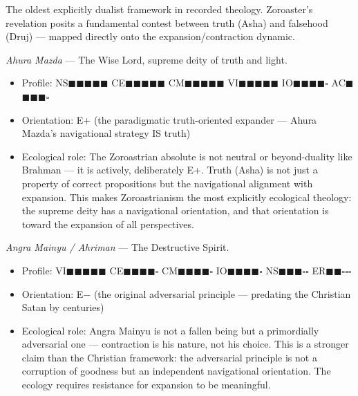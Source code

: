 The oldest explicitly dualist framework in recorded theology. Zoroaster's revelation posits a fundamental contest between truth (Asha) and falsehood (Druj) — mapped directly onto the expansion/contraction dynamic.


\textit{Ahura Mazda} — The Wise Lord, supreme deity of truth and light.

\begin{itemize}[nosep,leftmargin=*]
  \item Profile: NS$\blacksquare$$\blacksquare$$\blacksquare$$\blacksquare$$\blacksquare$ CE$\blacksquare$$\blacksquare$$\blacksquare$$\blacksquare$$\blacksquare$ CM$\blacksquare$$\blacksquare$$\blacksquare$$\blacksquare$$\blacksquare$ VI$\blacksquare$$\blacksquare$$\blacksquare$$\blacksquare$$\blacksquare$ IO$\blacksquare$$\blacksquare$$\blacksquare$$\blacksquare$$\square$ AC$\blacksquare$$\blacksquare$$\blacksquare$$\blacksquare$$\square$
  \item Orientation: E+ (the paradigmatic truth-oriented expander — Ahura Mazda's navigational strategy IS truth)
  \item Ecological role: The Zoroastrian absolute is not neutral or beyond-duality like Brahman — it is actively, deliberately E+. Truth (Asha) is not just a property of correct propositions but the navigational alignment with expansion. This makes Zoroastrianism the most explicitly ecological theology: the supreme deity has a navigational orientation, and that orientation is toward the expansion of all perspectives.
\end{itemize}


\textit{Angra Mainyu / Ahriman} — The Destructive Spirit.

\begin{itemize}[nosep,leftmargin=*]
  \item Profile: VI$\blacksquare$$\blacksquare$$\blacksquare$$\blacksquare$$\blacksquare$ CE$\blacksquare$$\blacksquare$$\blacksquare$$\blacksquare$$\square$ CM$\blacksquare$$\blacksquare$$\blacksquare$$\blacksquare$$\square$ IO$\blacksquare$$\blacksquare$$\blacksquare$$\blacksquare$$\square$ NS$\blacksquare$$\blacksquare$$\blacksquare$$\square$$\square$ ER$\blacksquare$$\blacksquare$$\square$$\square$$\square$
  \item Orientation: E− (the original adversarial principle — predating the Christian Satan by centuries)
  \item Ecological role: Angra Mainyu is not a fallen being but a primordially adversarial one — contraction is his nature, not his choice. This is a stronger claim than the Christian framework: the adversarial principle is not a corruption of goodness but an independent navigational orientation. The ecology requires resistance for expansion to be meaningful.
\end{itemize}


